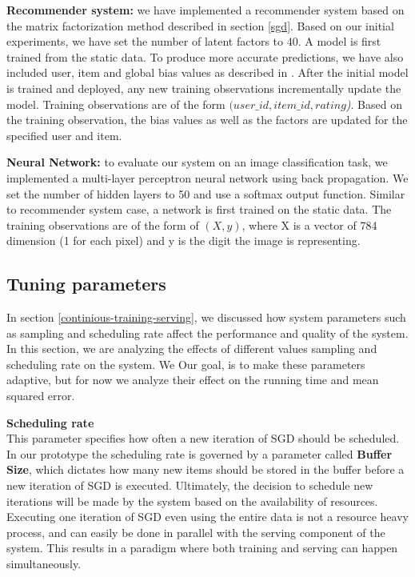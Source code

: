 \documentclass{sig-alternate-05-2015}
\begin{document}
\textbf{Recommender system:} we have implemented a recommender system based on the matrix factorization method described in section \ref{sgd}.
Based on our initial experiments, we have set the number of latent factors to 40.
A model is first trained from the static data.
To produce more accurate predictions, we have also included user, item and global bias values as described in \cite{koren2009matrix}.
After the initial model is trained and deployed, any new training observations incrementally update the model.
Training observations are of the form \textit{\((user\_id, item\_id, rating\))}.
Based on the training observation, the bias values as well as the factors are updated for the specified user and item.

\textbf{Neural Network:} to evaluate our system on an image classification task, we implemented a multi-layer perceptron neural network using back propagation\cite{collobert2004links}.
We set the number of hidden layers to 50 and use a softmax output function.
Similar to recommender system case, a network is first trained on the static data.
The training observations are of the form of \textit{\((X,y)\)}, where X is a vector of 784 dimension (1 for each pixel) and y is the digit the image is representing.


\subsection{Tuning parameters} \label{tuning}
In section \ref{continious-training-serving}, we discussed how system parameters such as sampling and scheduling rate affect the performance and quality of the system.
In this section, we are analyzing the effects of different values sampling and scheduling rate on the system.
We 
Our goal, is to make these parameters adaptive, but for now we analyze their effect on the running time and mean squared error. 

\textbf{Scheduling rate}\\
This parameter specifies how often a new iteration of SGD should be scheduled. 
In our prototype the scheduling rate is governed by a parameter called \textbf{Buffer Size}, which dictates how many new items should be stored in the buffer before a new iteration of SGD is executed. 
Ultimately, the decision to schedule new iterations will be made by the system based on the availability of resources. 
Executing one iteration of SGD even using the entire data is not a resource heavy process, and can easily be done in parallel with the serving component of the system. 
This results in a paradigm where both training and serving can happen simultaneously. 
\end{document}
